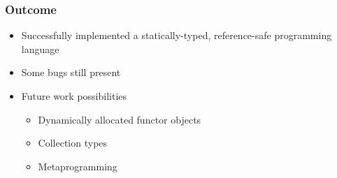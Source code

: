 \documentclass{beamer}
\begin{document}
\begin{frame}
\frametitle{Outcome}
\begin{itemize}
    \item Successfully implemented a statically-typed, reference-safe programming language
    \item Some bugs still present
    \item Future work possibilities
    \begin{itemize}
        \item Dynamically allocated functor objects
        \item Collection types
        \item Metaprogramming
    \end{itemize}
\end{itemize}
\end{frame}
\end{document}
